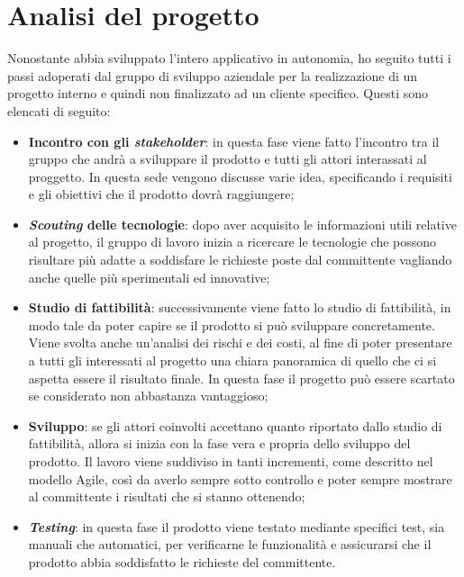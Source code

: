 \section{Analisi del progetto}
Nonostante abbia sviluppato l'intero applicativo in autonomia, ho seguito tutti i passi adoperati dal gruppo di sviluppo aziendale per la realizzazione
di un progetto interno e quindi non finalizzato ad un cliente specifico.
Questi sono elencati di seguito:
\begin{itemize}
    \item \textbf{Incontro con gli \emph{stakeholder}}: in questa fase viene fatto l’incontro tra il gruppo che andrà a sviluppare il prodotto e tutti 
    gli attori interassati al proggetto. In questa sede vengono discusse varie idea, specificando i requisiti e gli obiettivi che il prodotto dovrà 
    raggiungere;
    \item \textbf{\emph{Scouting} delle tecnologie}: dopo aver acquisito le informazioni utili relative al progetto, il gruppo di lavoro inizia a ricercare 
    le tecnologie che possono risultare più adatte a soddisfare le richieste poste dal committente vagliando anche quelle più sperimentali ed innovative;
    \item \textbf{Studio di fattibilità}: successivamente viene fatto lo studio di fattibilità, in modo tale da poter capire se il prodotto si può sviluppare 
    concretamente. Viene svolta anche un’analisi dei rischi e dei costi, al fine di poter presentare a tutti gli interessati al progetto una chiara panoramica
    di quello che ci si aspetta essere il risultato finale. In questa fase il progetto può essere scartato se considerato non abbastanza vantaggioso;
    \item \textbf{Sviluppo}: se gli attori coinvolti accettano quanto riportato dallo studio di fattibilità, allora si inizia con la fase vera 
    e propria dello sviluppo del prodotto. 
    Il lavoro viene suddiviso in tanti incrementi, come descritto nel modello Agile, così da averlo sempre sotto controllo e poter sempre mostrare 
    al committente i risultati che si stanno ottenendo;
    \item \textbf{\emph{Testing}}: in questa fase il prodotto viene testato mediante specifici test, sia manuali che automatici, per verificarne le 
    funzionalità e assicurarsi che il prodotto abbia soddisfatto le richieste del committente.
\end{itemize}


